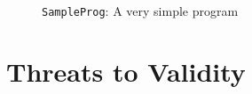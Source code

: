 

\begin{figure}[htbp]
\centering

\caption{{\tt SampleProg}: A very simple program}
\label{javaprog}
\end{figure}

\section{Threats to Validity}

